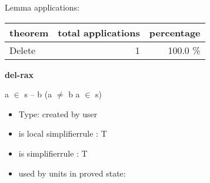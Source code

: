 \documentclass[a4paper]{article}
\begin{document}
Lemma applications:

\begin{supertabular}{l|r|r}
theorem	        & total applications & percentage \\ \hline
Delete & 1 & 100.0 \% \\

\end{supertabular}
\pagebreak

{\LARGE\bf del-rax}\label{lemma-del-rax}

\medskip

 \Fol a $\in$ s -- b \Equiv \Not \Not (a $\neq$ b \And a $\in$ s)

\begin{itemize}

\item Type: created by user

\item is local simplifierrule : T
\item is simplifierrule : T
\item used by units in proved state:


\end{itemize}
\end{document}
